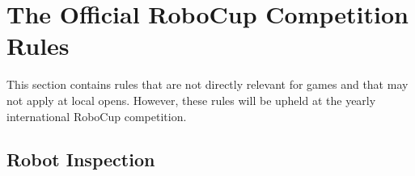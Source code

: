\section{The Official RoboCup Competition Rules}
\label{sec:robocup_rules}

This section contains rules that are not directly relevant for games and that may not apply at local opens.
However, these rules will be upheld at the yearly international RoboCup competition.









\subsection{Robot Inspection}
\label{sec:inspection}

